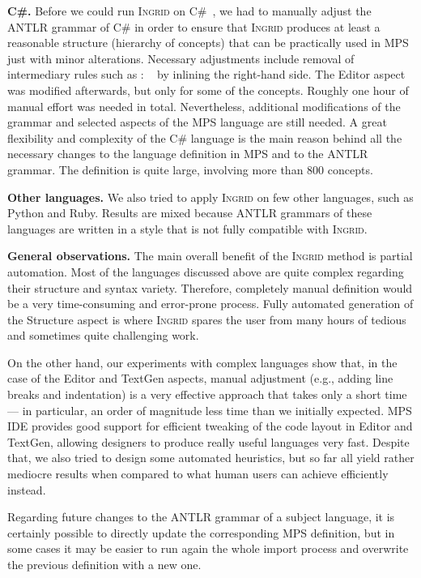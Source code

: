 \noindent\textbf{C\#.}
Before we could run \textsc{Ingrid} on C\#~\cite{ref:CSHARP}, we had to manually adjust the ANTLR grammar of C\# in order to ensure that \textsc{Ingrid} produces at least a reasonable structure (hierarchy of concepts) that can be practically used in MPS just with minor alterations.
Necessary adjustments include removal of intermediary rules such as  : ~\antlrliteral{;} by inlining the right-hand side.
The Editor aspect was modified afterwards, but only for some of the concepts. 
Roughly one hour of manual effort was needed in total.
Nevertheless, additional modifications of the grammar and selected aspects of the MPS language are still needed.
A great flexibility and complexity of the C\# language is the main reason behind all the necessary changes to the language definition in MPS and to the ANTLR grammar.
The definition is quite large, involving more than 800 concepts.

\noindent\textbf{Other languages.}
We also tried to apply \textsc{Ingrid} on few other languages, such as Python and Ruby.
Results are mixed because ANTLR grammars of these languages are written in a style that is not fully compatible with \textsc{Ingrid}.

\noindent\textbf{General observations.}
The main overall benefit of the \textsc{Ingrid} method is partial automation.
Most of the languages discussed above are quite complex regarding their structure and syntax variety.
Therefore, completely manual definition would be a very time-consuming and error-prone process.
Fully automated generation of the Structure aspect is where \textsc{Ingrid} spares the user from many hours of tedious and sometimes quite challenging work.

On the other hand, our experiments with complex languages show that, in the case of the Editor and TextGen aspects, manual adjustment (e.g., adding line breaks and indentation) is a very effective approach that takes only a short time --- in particular, an order of magnitude less time than we initially expected.
MPS IDE provides good support for efficient tweaking of the code layout in Editor and TextGen, allowing designers to produce really useful languages very fast.
Despite that, we also tried to design some automated heuristics, but so far all yield rather mediocre results when compared to what human users can achieve efficiently instead.

Regarding future changes to the ANTLR grammar of a subject language, it is certainly possible to directly update the corresponding MPS definition, but in some cases it may be easier to run again the whole import process and overwrite the previous definition with a new one.

